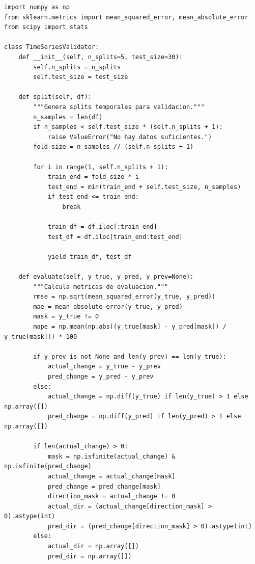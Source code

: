 \begin{lstlisting}[frame=single, caption={Validador walk-forward}]
import numpy as np
from sklearn.metrics import mean_squared_error, mean_absolute_error
from scipy import stats

class TimeSeriesValidator:
    def __init__(self, n_splits=5, test_size=30):
        self.n_splits = n_splits
        self.test_size = test_size
    
    def split(self, df):
        """Genera splits temporales para validacion."""
        n_samples = len(df)
        if n_samples < self.test_size * (self.n_splits + 1):
            raise ValueError("No hay datos suficientes.")
        fold_size = n_samples // (self.n_splits + 1)
        
        for i in range(1, self.n_splits + 1):
            train_end = fold_size * i
            test_end = min(train_end + self.test_size, n_samples)
            if test_end <= train_end:
                break
            
            train_df = df.iloc[:train_end]
            test_df = df.iloc[train_end:test_end]
            
            yield train_df, test_df
    
    def evaluate(self, y_true, y_pred, y_prev=None):
        """Calcula metricas de evaluacion."""
        rmse = np.sqrt(mean_squared_error(y_true, y_pred))
        mae = mean_absolute_error(y_true, y_pred)
        mask = y_true != 0
        mape = np.mean(np.abs((y_true[mask] - y_pred[mask]) / y_true[mask])) * 100
        
        if y_prev is not None and len(y_prev) == len(y_true):
            actual_change = y_true - y_prev
            pred_change = y_pred - y_prev
        else:
            actual_change = np.diff(y_true) if len(y_true) > 1 else np.array([])
            pred_change = np.diff(y_pred) if len(y_pred) > 1 else np.array([])
        
        if len(actual_change) > 0:
            mask = np.isfinite(actual_change) & np.isfinite(pred_change)
            actual_change = actual_change[mask]
            pred_change = pred_change[mask]
            direction_mask = actual_change != 0
            actual_dir = (actual_change[direction_mask] > 0).astype(int)
            pred_dir = (pred_change[direction_mask] > 0).astype(int)
        else:
            actual_dir = np.array([])
            pred_dir = np.array([])
        

\end{lstlisting}
